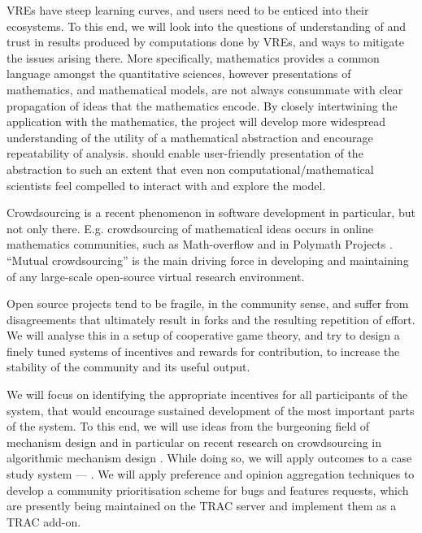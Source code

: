 \begin{workpackage}[id=social-aspects,wphases=0-48,
  title=Social Aspects,
  lead=UO,
  UORM=27,USHRM=8, USORM=6]
\begin{wpobjectives}
VREs have steep learning curves, and users need to be enticed into
their ecosystems. To this end, we will look into the
questions of understanding of and trust in results produced by computations done by VREs,
and ways to mitigate the issues arising there. More specifically,
mathematics provides a common language amongst the quantitative
sciences, however presentations of mathematics, and mathematical
models, are not always consummate with clear propagation of ideas that
the mathematics encode. By closely intertwining the application with
the mathematics, the project will develop more widespread
understanding of the utility of a mathematical abstraction and
encourage repeatability of analysis. \TheProject should enable
user-friendly presentation of the abstraction to such an extent that
even non computational/mathematical scientists feel compelled to
interact with and explore the model.
\end{wpobjectives}

\begin{wpdescription}
Crowdsourcing is a recent phenomenon in software development in
particular, but not only there. E.g.  crowdsourcing of mathematical
ideas occurs in online mathematics communities, such as Math-overflow
\cite{mathoverflow} and in Polymath Projects \cite{polymath_SIAM, PolymathBlog}.
``Mutual crowdsourcing'' is the main driving force in developing and
maintaining of any large-scale open-source virtual research
environment.

Open source projects tend to be fragile, in the community sense, and
suffer from disagreements that ultimately result in forks and the
resulting repetition of effort. We will analyse this in a setup of
cooperative game theory, and try to design a finely tuned systems of
incentives and rewards for contribution, to increase the stability of
the community and its useful output.

We will focus on identifying the appropriate incentives for all
participants of the system, that would encourage sustained development
of the most important parts of the system.  To this end, we will use
ideas from the burgeoning field of mechanism design \cite{AGTbook} and
in particular on recent research on crowdsourcing in algorithmic
mechanism design \cite{crowds}.  While doing so, we will apply
outcomes to a case study system --- \Sage.  We will apply preference
and opinion aggregation techniques \cite{pref-aggr} to develop a
community prioritisation scheme for \Sage bugs and features requests,
which are presently being maintained on the \Sage TRAC server
\cite{trac-sagemath} and implement them as a TRAC \cite{Trac} add-on.


\end{wpdescription}
\end{workpackage}
